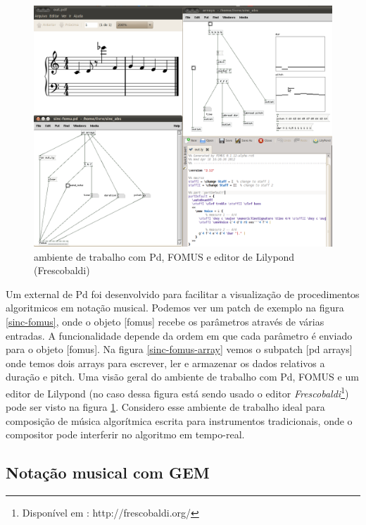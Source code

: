 \documentclass{ppgmus}
\begin{document}
\begin{figure}
\includegraphics[scale=.3]{trab-fomus}
\caption{ambiente de trabalho com Pd, FOMUS e editor de Lilypond (Frescobaldi)}
\label{trab-fomus}
\end{figure}




Um external de Pd foi desenvolvido para facilitar a visualização
de procedimentos algoritmicos em notação musical. Podemos ver um patch de
exemplo na figura \ref{sinc-fomus}, onde o objeto [fomus] recebe os parâmetros através
de várias entradas. A funcionalidade depende da ordem em que cada parâmetro
é enviado para o objeto [fomus]. Na figura \ref{sinc-fomus-array} vemos o subpatch [pd arrays]
onde temos dois arrays para escrever, ler e armazenar os dados relativos a
duração e pitch. Uma visão geral do ambiente de trabalho com Pd, FOMUS e 
um editor de Lilypond (no caso dessa figura está sendo usado o editor
\textit{Frescobaldi}\footnote{Disponível em : http://frescobaldi.org/}) pode ser visto na figura \ref{trab-fomus}.
Considero esse ambiente de trabalho ideal para composição de música algorítmica
escrita para instrumentos tradicionais, onde o compositor pode interferir no algoritmo em 
tempo-real.







\subsection{Notação musical com GEM}
\label{GEM-sec}
\end{document}
